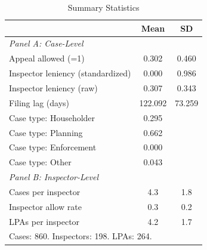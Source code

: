 \begin{table}[t]
\centering
\caption{Summary Statistics}
\label{tab:summary}
\begin{tabular}{lcc}
\hline\hline
 & Mean & SD \\
\hline
\multicolumn{3}{l}{\textit{Panel A: Case-Level}} \\[3pt]
Appeal allowed (=1) & 0.302 & 0.460 \\
Inspector leniency (standardized) & 0.000 & 0.986 \\
Inspector leniency (raw) & 0.307 & 0.343 \\
Filing lag (days) & 122.092 & 73.259 \\
Case type: Householder & 0.295 &  \\
Case type: Planning & 0.662 &  \\
Case type: Enforcement & 0.000 &  \\
Case type: Other & 0.043 &  \\[6pt]
\multicolumn{3}{l}{\textit{Panel B: Inspector-Level}} \\[3pt]
Cases per inspector & 4.3 & 1.8 \\
Inspector allow rate & 0.3 & 0.2 \\
LPAs per inspector & 4.2 & 1.7 \\
\hline
\multicolumn{3}{l}{\footnotesize Cases: 860. Inspectors: 198. LPAs: 264.} \\
\end{tabular}
\end{table}
